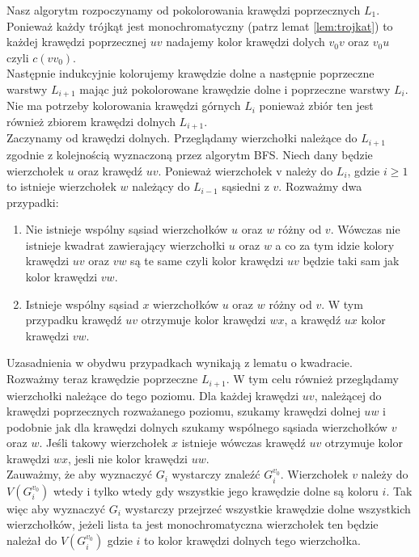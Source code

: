 \documentclass[12pt,a4paper,titlepage]{article}
\newcommand\tab[1][1cm]{\hspace*{#1}}
\begin{document}
Nasz algorytm rozpoczynamy od pokolorowania krawędzi poprzecznych $L_1$. Ponieważ każdy trójkąt jest monochromatyczny (patrz lemat \ref{lem:trojkat}) to każdej krawędzi poprzecznej $uv$ nadajemy kolor krawędzi dolych $v_0 v$ oraz $v_0 u$  czyli $c(v v_0 )$.\\

Następnie indukcyjnie kolorujemy krawędzie dolne a następnie poprzeczne warstwy $L_{i+1}$ mając już pokolorowane krawędzie dolne i poprzeczne  warstwy $L_i$. Nie ma potrzeby kolorowania krawędzi górnych $L_i$ ponieważ zbiór ten jest również zbiorem krawędzi dolnych $L_{i+1}$.\\

Zaczynamy od krawędzi dolnych. Przeglądamy wierzchołki należące do $L_{i+1}$ zgodnie z kolejnością wyznaczoną przez algorytm BFS. Niech dany będzie wierzchołek $u$ oraz krawędź $uv$. Ponieważ wierzchołek v należy do $L_i$, gdzie $i\geqslant 1$ to istnieje wierzchołek $w$ należący do $L_{i-1}$ sąsiedni z $v$. Rozważmy dwa przypadki:
\begin{enumerate}
\item Nie istnieje wspólny sąsiad wierzchołków $u$ oraz $w$ różny od $v$. Wówczas nie istnieje kwadrat zawierający wierzchołki $u$ oraz $w$ a co za tym idzie kolory krawędzi $uv$ oraz $vw$ są te same czyli kolor krawędzi $uv$ będzie taki sam jak kolor krawędzi $vw$.
\item Istnieje wspólny sąsiad $x$ wierzchołków $u$ oraz $w$ różny od $v$. W tym przypadku krawędź $uv$ otrzymuje kolor krawędzi $wx$, a krawędź $ux$ kolor krawędzi $vw$. 
\end{enumerate}
Uzasadnienia w obydwu przypadkach wynikają z lematu o kwadracie.\\
\tab[0.6cm]Rozważmy teraz krawędzie poprzeczne $L_{i+1}$. W tym celu również przeglądamy wierzchołki należące do tego poziomu. Dla każdej krawędzi $uv$, należącej do krawędzi poprzecznych rozważanego poziomu, szukamy krawędzi dolnej $uw$ i podobnie jak dla krawędzi dolnych szukamy wspólnego sąsiada wierzchołków $v$ oraz $w$. Jeśli takowy wierzchołek $x$ istnieje wówczas krawędź $uv$ otrzymuje kolor krawędzi $wx$, jesli nie kolor krawędzi $uw$.\\

Zauważmy, że aby wyznaczyć $G_i$ wystarczy znaleźć $G_i ^{v_0}$. Wierzchołek $v$ należy do $V(G_i ^{v_0})$ wtedy i tylko wtedy gdy wszystkie jego krawędzie dolne są koloru $i$. Tak więc aby wyznaczyć $G_i$ wystarczy przejrzeć wszystkie krawędzie dolne wszystkich wierzchołków, jeżeli lista ta jest monochromatyczna wierzchołek ten będzie należał do $V(G_i ^{v_0})$ gdzie $i$ to kolor krawędzi dolnych tego wierzchołka.\\
\end{document}
